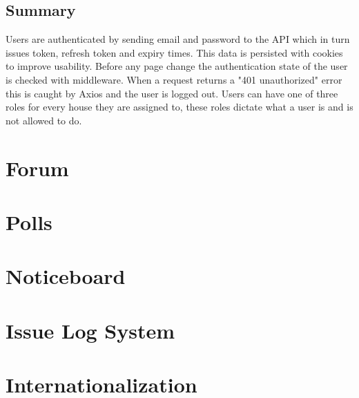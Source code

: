 \subsection{Summary}
Users are authenticated by sending email and password to the API which in turn issues token, refresh token and expiry times. This data is persisted with cookies to improve usability. Before any page change the authentication state of the user is checked with middleware. When a request returns a "401 unauthorized" error this is caught by Axios and the user is logged out. Users can have one of three roles for every house they are assigned to, these roles dictate what a user is and is not allowed to do.


\section{Forum}

\section{Polls}

\section{Noticeboard}

\section{Issue Log System}

\section{Internationalization}
